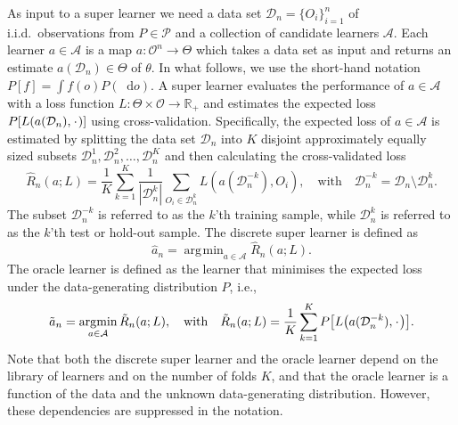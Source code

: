 \documentclass[a4paper,danish]{article}
\theoremstyle{plain} %
\numberwithin{theorem}{section}
\theoremstyle{definition} %
\theoremstyle{remark}
\newcommand{\R}{\mathbb{R}}
\newcommand{\blank}{\makebox[1ex]{\textbf{$\cdot$}}}
\newcommand*\diff{\mathop{}\!\mathrm{d}}
\newcommand{\1}{\mathds{1}}
\DeclareMathOperator*{\argmin}{\arg\!\min}
\newcommand{\empmeas}{\ensuremath{\mathbb{P}_n}} %
\newcommand{\data}{\ensuremath{\mathcal{D}}}
\begin{document}
As input to a super learner we need a data set
\( \data_n=\{O_i\}_{i=1}^n \) of i.i.d.\ observations from
\( P \in \mathcal{P} \) and a collection of candidate learners
$\mathcal{A}$. Each learner \(a \in \mathcal{A}\) is a map
\( a \colon \mathcal{O}^n \rightarrow \Theta \) which takes a
data set as input and returns an estimate
$a(\data_n) \in \Theta$ of $\theta$.
In what follows, we use the short-hand notation
\(P[f] = \int f(o) P(\diff o) \). A super learner evaluates the
performance of \(a \in \mathcal{A}\) with a loss function
\(L\colon \Theta \times \mathcal{O} \rightarrow \R_+\) and
estimates the expected loss \(P[L(a(\data_n), \blank)]\) using
cross-validation. Specifically, the expected loss of $a\in\mathcal A$
is estimated by splitting the data set $\data_n$ into $K$ disjoint
approximately equally sized subsets
\(\data_n^1, \data_n^2, \dots, \data_n^K \) and then calculating the
cross-validated loss
\begin{equation*}
  \hat{R}_n(a; L) =
  \frac{1}{K}\sum_{k=1}^{K}
  \frac{1}{| \data_n^{k} |}\sum_{O_i \in \data_n^{k}}
  L
  {
    \left(
      a{ (\data_n^{-k})}
      , O_i
    \right)
  },
  \quad \text{with} \quad
  \data_n^{-k} = \data_n \setminus \data_n^{k}.
\end{equation*}
The subset \(\data_n^{-k}\) is referred to as the \(k\)'th training
sample, while \(\data_n^{k}\) is referred to as the \(k\)'th test or
hold-out sample.
The discrete super learner is defined as
\begin{equation*}
\hat{a}_n = \argmin_{a\in\mathcal A}\hat{R}_n(a; L).
\end{equation*}
The oracle learner is defined as the learner that minimises the
expected loss under the data-generating distribution \( P \),
i.e.,
\begin{equation*}
  \tilde{a}_n =
  \argmin_{a \in \mathcal{A}}
  \tilde{R}_n(a; L),
  \quad \text{with} \quad 
  \tilde{R}_n(a; L)=
  \frac{1}{K}\sum_{k=1}^{K} 
  P{
    \left[
      L
      {
        \left(
          a{ (\data_n^{-k})}
          , \blank
        \right)
      }
    \right]}
  .
\end{equation*}
Note that both the discrete super learner and the oracle learner
depend on the library of learners and on the number of folds \(K\),
and that the oracle learner is a function of the data and the unknown
data-generating distribution. However, these dependencies are
suppressed in the notation.
\end{document}
